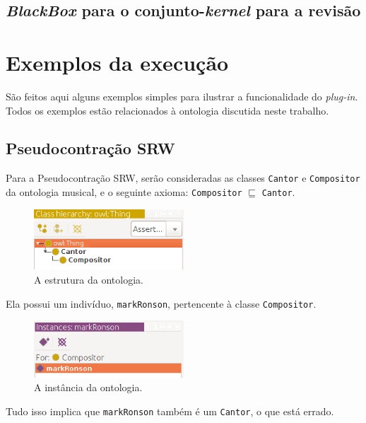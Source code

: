 \subsection{\textit{BlackBox} para o conjunto-\textit{kernel} para a revisão}

\section{Exemplos da execução}

São feitos aqui alguns exemplos simples para ilustrar a funcionalidade do \textit{plug-in}. Todos os exemplos estão relacionados à ontologia discutida neste trabalho.

\subsection{Pseudocontração SRW}

Para a Pseudocontração SRW, serão consideradas as classes \texttt{Cantor} e \texttt{Compositor} da ontologia musical, e o seguinte axioma: \texttt{Compositor} $ \sqsubseteq $ \texttt{Cantor}.

\begin{figure}[H]
	\centering
	\includegraphics[width=0.5\textwidth]{Capitulos/Implementacao/srw1.png}
	\caption{A estrutura da ontologia.}
\end{figure}

Ela possui um indivíduo, \texttt{markRonson}, pertencente à classe \texttt{Compositor}.

\begin{figure}[H]
	\centering
	\includegraphics[width=0.5\textwidth]{Capitulos/Implementacao/srw2.png}
	\caption{A instância da ontologia.}
\end{figure}

Tudo isso implica que \texttt{markRonson} também é um \texttt{Cantor}, o que está errado. 

